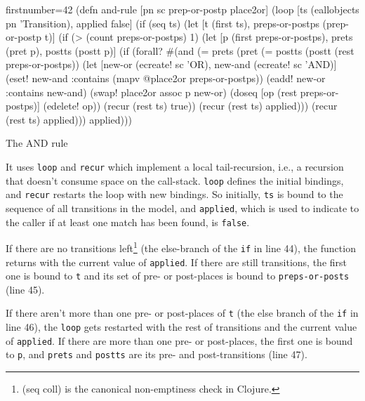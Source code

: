 \documentclass[submission]{eptcs}
\begin{document}
\begin{listing}[H]
  \begin{clojurecode*}{firstnumber=42}
(defn and-rule [pn sc prep-or-postp place2or]
  (loop [ts (eallobjects pn 'Transition), applied false]
    (if (seq ts)
      (let [t (first ts), preps-or-postps (prep-or-postp t)]
        (if (> (count preps-or-postps) 1)
          (let [p (first preps-or-postps), prets (pret p), postts (postt p)]
            (if (forall? #(and (= prets  (pret %
                               (= postts (postt %
                         (rest preps-or-postps))
              (let [new-or  (ecreate! sc 'OR), new-and (ecreate! sc 'AND)]
                (eset! new-and :contains (mapv @place2or preps-or-postps))
                (eadd! new-or  :contains new-and)
                (swap! place2or assoc p new-or)
                (doseq [op (rest preps-or-postps)]
                  (edelete! op))
                (recur (rest ts) true))
              (recur (rest ts) applied)))
          (recur (rest ts) applied)))
      applied)))
  \end{clojurecode*}
  \label{lst:and-rule}
  \caption{The AND rule}
\end{listing}

It uses \verb|loop| and \verb|recur| which implement a local tail-recursion,
i.e., a recursion that doesn't consume space on the call-stack.  \verb|loop|
defines the initial bindings, and \verb|recur| restarts the loop with new
bindings.  So initially, \verb|ts| is bound to the sequence of all transitions
in the model, and \verb|applied|, which is used to indicate to the caller if at
least one match has been found, is \verb|false|.

If there are no transitions left\footnote{\textsf{(seq coll) is the canonical
    non-emptiness check in Clojure.}} (the else-branch of the \verb|if| in line
44), the function returns with the current value of \verb|applied|.  If there
are still transitions, the first one is bound to \verb|t| and its set of pre-
or post-places is bound to \verb|preps-or-posts| (line 45).

If there aren't more than one pre- or post-places of \verb|t| (the else branch
of the \verb|if| in line 46), the \verb|loop| gets restarted with the rest of
transitions and the current value of \verb|applied|.  If there are more than
one pre- or post-places, the first one is bound to \verb|p|, and \verb|prets|
and \verb|postts| are its pre- and post-transitions (line 47).
\end{document}
